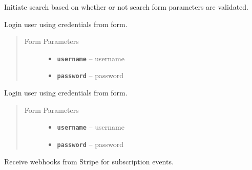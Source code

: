 \documentclass[letterpaper,10pt,english]{sphinxmanual}
\begin{document}
\begin{fulllineitems}
\label{users:post--user-search}
Initiate search based on whether or not search form parameters are validated.

\end{fulllineitems}



\begin{fulllineitems}
\label{users:get--user-login}
Login user using credentials from form.
\begin{quote}\begin{description}
\item[{Form Parameters}] \leavevmode\begin{itemize}
\item {} 
\textbf{\texttt{username}} -- username

\item {} 
\textbf{\texttt{password}} -- password

\end{itemize}

\end{description}\end{quote}

\end{fulllineitems}



\begin{fulllineitems}
\label{users:post--user-login}
Login user using credentials from form.
\begin{quote}\begin{description}
\item[{Form Parameters}] \leavevmode\begin{itemize}
\item {} 
\textbf{\texttt{username}} -- username

\item {} 
\textbf{\texttt{password}} -- password

\end{itemize}

\end{description}\end{quote}

\end{fulllineitems}



\begin{fulllineitems}
\label{users:post--user-hook-}
Receive webhooks from Stripe for subscription events.

\end{fulllineitems}
\end{document}
